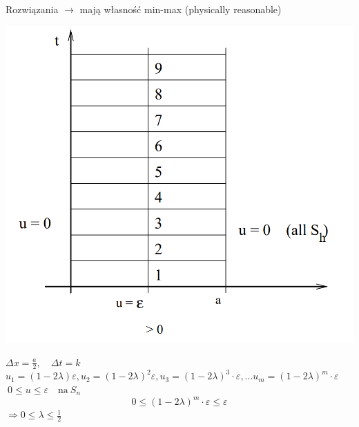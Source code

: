 \begin{frame}
Rozwiązania $\rightarrow$ mają własność min-max (physically reasonable)
\centerline{\includegraphics[height = 0.70 \textheight]{img/23/stabilnosc4}}
\end{frame}

\begin{frame}
$\Delta x = \frac{a}{2} , \quad \Delta t = k$ \\
\vspace{5mm}
$u_1 = (1 - 2 \lambda)\varepsilon ,    u_2 = (1 - 2\lambda )^2\varepsilon , u_3 = (1-2\lambda)^3 \cdot \varepsilon , ... u_m = (1-2\lambda)^m\cdot \varepsilon$ \\
\vspace{5mm}
$\ 0 \leq u \leq \varepsilon  \quad \text{na} \ S_n$
$$0 \leq (1-2 \lambda)^m \cdot \varepsilon \leq \varepsilon$$
$\Longrightarrow 0 \leq \lambda \leq \frac{1}{2}$
\end{frame}